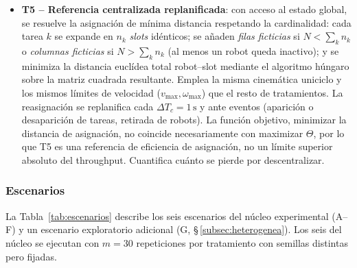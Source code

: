 \begin{itemize}
  \item \textbf{T5 -- Referencia centralizada replanificada}: con acceso al
    estado global, se resuelve la asignación de mínima distancia respetando la
    cardinalidad: cada tarea $k$ se expande en $n_k$ \emph{slots} idénticos; se
    añaden \emph{filas ficticias} si $N < \sum_k n_k$ o \emph{columnas ficticias}
    si $N > \sum_k n_k$ (al menos un robot queda inactivo); y se minimiza la
    distancia euclídea total robot--slot mediante el algoritmo húngaro sobre la
    matriz cuadrada resultante. Emplea la misma cinemática uniciclo y los mismos
    límites de velocidad ($v_{\max},\omega_{\max}$) que el resto de tratamientos.
    La reasignación se replanifica cada $\Delta T_c = 1\,\text{s}$ y ante eventos
    (aparición o desaparición de tareas, retirada de robots). La función objetivo,
    minimizar la distancia de asignación, no coincide necesariamente con maximizar
    $\Theta$, por lo que T5 es una referencia de eficiencia de asignación, no un
    límite superior absoluto del throughput. Cuantifica cuánto se pierde por
    descentralizar.
\end{itemize}

\subsubsection{Escenarios}

La Tabla~\ref{tab:escenarios} describe los seis escenarios del núcleo experimental
(A--F) y un escenario exploratorio adicional (G, \S\,\ref{subsec:heterogenea}). Los
seis del núcleo se ejecutan con $m = 30$ repeticiones por tratamiento con semillas
distintas pero fijadas.

